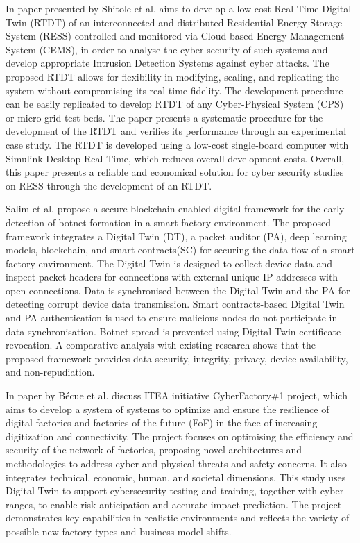  In\cite{shitoleRealTimeDigitalTwin2021} paper presented by Shitole et al. aims to develop a low-cost Real-Time Digital Twin (RTDT) of an interconnected and distributed Residential Energy Storage System (RESS) controlled and monitored via Cloud-based Energy Management System (CEMS), in order to analyse the cyber-security of such systems and develop appropriate Intrusion Detection Systems against cyber attacks. The proposed RTDT allows for flexibility in modifying, scaling, and replicating the system without compromising its real-time fidelity. The development procedure can be easily replicated to develop RTDT of any Cyber-Physical System (CPS) or micro-grid test-beds. The paper presents a systematic procedure for the development of the RTDT and verifies its performance through an experimental case study. The RTDT is developed using a low-cost single-board computer with Simulink Desktop Real-Time, which reduces overall development costs. Overall, this paper presents a reliable and economical solution for cyber security studies on RESS through the development of an RTDT.


 Salim et al.\cite{salimBlockchainEnabledSecureDigital2022} propose a secure blockchain-enabled digital framework for the early detection of botnet formation in a smart factory environment. The proposed framework integrates a Digital Twin (DT), a packet auditor (PA), deep learning models, blockchain, and smart contracts(SC) for securing the data flow of a smart factory environment. The Digital Twin is designed to collect device data and inspect packet headers for connections with external unique IP addresses with open connections. Data is synchronised between the Digital Twin and the PA for detecting corrupt device data transmission. Smart contracts-based Digital Twin and PA authentication is used to ensure malicious nodes do not participate in data synchronisation. Botnet spread is prevented using Digital Twin certificate revocation. A comparative analysis with existing research shows that the proposed framework provides data security, integrity, privacy, device availability, and non-repudiation.


In \cite{becueCyberFactorySecuringIndustry40with2018} paper by Bécue et al. discuss ITEA initiative CyberFactory\#1 project, which aims to develop a system of systems to optimize and ensure the resilience of digital factories and factories of the future (FoF) in the face of increasing digitization and connectivity. The project focuses on optimising the efficiency and security of the network of factories, proposing novel architectures and methodologies to address cyber and physical threats and safety concerns. It also integrates technical, economic, human, and societal dimensions. This study uses Digital Twin to support cybersecurity testing and training, together with cyber ranges, to enable risk anticipation and accurate impact prediction. The project demonstrates key capabilities in realistic environments and reflects the variety of possible new factory types and business model shifts.



